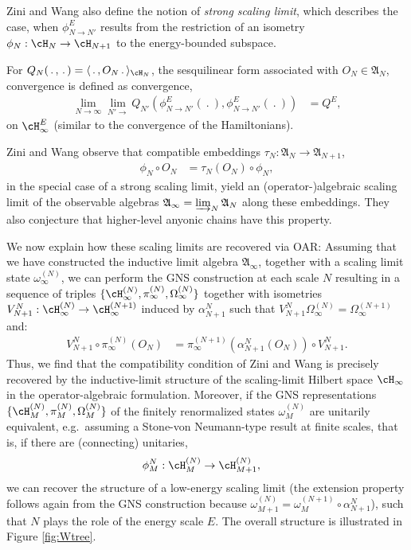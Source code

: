 \documentclass[a4paper, 11pt]{article}
\newcommand{\fA}{\mathfrak{A}}\newcommand{\cA}{\mathcal{A}}\newcommand{\dA}{\mathds{A}}\newcommand{\sA}{\mathscr{A}}
\DeclareMathOperator{\1}{\mathds{1}}
\begin{document}
Zini and Wang also define the notion of \emph{strong scaling limit}, which describes the case, when $\phi^{E}_{N\rightarrow N'}$ results from the restriction of an isometry $\phi_{N}:\cH_{N}\rightarrow\cH_{N+1}$ to the energy-bounded subspace.

For $Q_{N}(\!\ .\!\ ,\!\ .\!\ ) = \langle\!\ .\!\ ,O_{N}\!\ .\!\ \rangle_{\cH_{N}}$, the sesquilinear form associated with $O_{N}\in\fA_{N}$, convergence is defined as convergence,
\begin{align*}
\lim_{N\rightarrow\infty}\lim_{N'\rightarrow}Q_{N'}(\phi^{E}_{N\rightarrow N'}(\!\ .\!\ ),\phi^{E}_{N\rightarrow N'}(\!\ .\!\ )) & = Q^{E},
\end{align*}
on $\cH^{E}_{\infty}$ (similar to the convergence of the Hamiltonians).

Zini and Wang observe \cite[p. 898]{ZiniConformalFieldTheories} that compatible embeddings $\tau_{N}:\fA_{N}\rightarrow\fA_{N+1}$,
\begin{align*}
\phi_{N}\circ O_{N} & = \tau_{N}(O_{N}) \circ \phi_{N},
\end{align*}
 in the special case of a strong scaling limit, yield an (operator-)algebraic scaling limit of the observable algebras $\fA_{\infty} = \varinjlim_{N}\fA_{N}$ along these embeddings. They also conjecture that higher-level anyonic chains have this property. 

 We now explain how these scaling limits are recovered via OAR: Assuming that we have constructed the inductive limit algebra $\fA_{\infty}$, together with a scaling limit state $\omega^{(N)}_{\infty}$, we can perform the GNS construction at each scale $N$ resulting in a sequence of triples $\{\cH_{\infty}^{(N)}, \pi_{\infty}^{(N)}, \Omega_{\infty}^{(N)}\}$ together with isometries $V^{N}_{N+1}:\cH_{\infty}^{(N)}\rightarrow\cH_{\infty}^{(N+1)}$ induced by $\alpha^{N}_{N+1}$ such that $V^{N}_{N+1}\Omega_{\infty}^{(N)} = \Omega_{\infty}^{(N+1)}$ and:
\begin{align*}
V^{N}_{N+1}\circ \pi_{\infty}^{(N)}(O_{N}) & = \pi_{\infty}^{(N+1)}(\alpha^{N}_{N+1}(O_{N}))\circ V^{N}_{N+1}.
\end{align*}
Thus, we find that the compatibility condition of Zini and Wang is precisely recovered by the inductive-limit structure of the scaling-limit Hilbert space $\cH_{\infty}$ in the operator-algebraic formulation. Moreover, if the GNS representations $\{\cH_{M}^{(N)}, \pi_{M}^{(N)}, \Omega_{M}^{(N)}\}$ of the finitely renormalized states $\omega^{(N)}_{M}$ are unitarily equivalent, e.g.~assuming a Stone-von Neumann-type result at finite scales, that is, if there are (connecting) unitaries,
\begin{align*}
\phi^{N}_{M} : \cH_{M}^{(N)} & \rightarrow \cH_{M+1}^{(N)},
\end{align*}
we can recover the structure of a low-energy scaling limit (the extension property follows again from the GNS construction because $\omega^{(N)}_{M+1} = \omega^{(N+1)}_{M}\circ\alpha^{N}_{N+1}$), such that $N$ plays the role of the energy scale $E$. The overall structure is illustrated in Figure \ref{fig:Wtree}.
\end{document}
